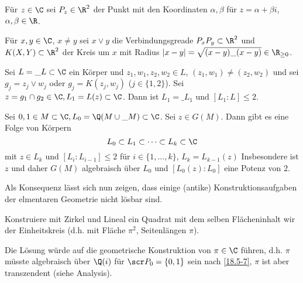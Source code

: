 Für $z \in \C$ sei $P_z \in \R^2$ der Punkt mit den Koordinaten $\alpha, \beta$ für $z = \alpha + \beta i$, $\alpha, \beta \in \R$.

\begin{conv} \label{18.5-5}
	Für $x,y \in \C$, $x \neq y$ sei $x \vee y$ die Verbindungsgreade $P_x P_y \subset \R^2$ und $K(X, Y) \subset \R^2$ der Kreis um $x$ mit Radius $|x-y| = \sqrt{(x-y)\_{(x-y)}} \in \R_{\ge 0}$.
\end{conv}

\begin{st} \label{18.5-6}
	Sei $L = \_L \subset \C$ ein Körper und $z_1, w_1, z_2, w_2 \in L$, $(z_1, w_1) \neq (z_2, w_2)$ und sei $g_j = z_j \vee w_j$ oder $g_j = K(z_j, w_j)$ ($j \in \{1, 2\}$).
	Sei $z = g_1 \cap g_2 \in \C, L_1 = L(z) \subset \C$.
	Dann ist $L_1 = \_{L_1}$ und $[L_1 : L] \le 2$.
\end{st}

\begin{kor} \label{18.5-7}
	Sei $0, 1 \in M \subset \C, L_0 = \Q(M \cup \_{M}) \subset \C$.
	Sei $z \in G(M)$.
	Dann gibt es eine Folge von Körpern
	\[
		L_0 \subset L_1 \subset \dotsb \subset L_k \subset \C
	\]
	mit $z \in L_k$ und $[L_i : L_{i-1}] \le 2$ für $i \in \{1, \dotsc, k\}$, $L_k = L_{k-1}(z)$
	Insbesondere ist $z$ und daher $G(M)$ algebraisch über $L_0$ und $[L_0(z) : L_0]$ eine Potenz von $2$.
\end{kor}

Als Konsequenz lässt sich nun zeigen, dass einige (antike) Konstruktionsaufgaben der elmentaren Geometrie nicht lösbar sind.

\begin{ex} \label{18.5-8}
	Konstruiere mit Zirkel und Lineal ein Quadrat mit dem selben Flächeninhalt wir der Einheitskreis (d.h. mit Fläche $\pi^2$, Seitenlängen $\pi$).

	Die Lösung würde auf die geometrische Konstruktion von $\pi \in \C$ führen, d.h. $\pi$ müsste algebraisch über $\Q(i)$ für $\scr P_0 = \{0, 1\}$ sein nach \ref{18.5-7}, $\pi$ ist aber transzendent (siehe Analysis).
\end{ex}
